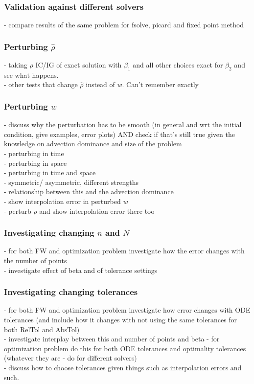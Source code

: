 \documentclass[11pt, a4paper]{article}
\theoremstyle{definition}
\begin{document}
\subsubsection{Validation against different solvers}
- compare results of the same problem for fsolve, picard and fixed point method
\subsubsection{Perturbing $\hat \rho$}
- taking $\rho$ IC/IG of exact solution with $\beta_1$ and all other choices exact for $\beta_2$ and see what happens. \\
- other tests that change $\hat \rho$ instead of $w$. Can't remember exactly
\subsubsection{Perturbing $w$}
- discuss why the perturbation has to be smooth (in general and wrt the initial condition, give examples, error plots) AND check if that's still true given the knowledge on advection dominance and size of the problem\\
- perturbing in time \\
- perturbing in space \\
- perturbing in time and space \\
- symmetric/ asymmetric, different strengths\\
- relationship between this and the advection dominance\\
- show interpolation error in perturbed $w$\\
- perturb $\rho$ and show interpolation error there too
\subsubsection{Investigating changing $n$ and $N$}
- for both FW and optimization problem investigate how the error changes with the number of points\\
- investigate effect of beta and of tolerance settings
\subsubsection{Investigating changing tolerances}
- for both FW and optimization problem investigate how error changes with ODE tolerances (and include how it changes with not using the same tolerances for both RelTol and AbsTol)\\
- investigate interplay between this and number of points and beta
- for optimization problem do this for both ODE tolerances and optimality tolerances (whatever they are - do for different solvers)\\
- discuss how to choose tolerances given things such as interpolation errors and such.
\end{document}
